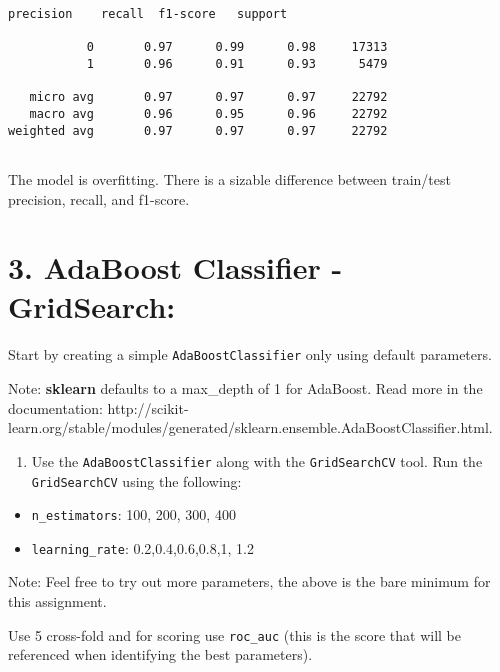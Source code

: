 \documentclass[11pt]{article}
\providecommand{\tightlist}{%
      \setlength{\itemsep}{0pt}\setlength{\parskip}{0pt}}
\begin{document}
    \begin{Verbatim}[commandchars=\\\{\}]
              precision    recall  f1-score   support

           0       0.97      0.99      0.98     17313
           1       0.96      0.91      0.93      5479

   micro avg       0.97      0.97      0.97     22792
   macro avg       0.96      0.95      0.96     22792
weighted avg       0.97      0.97      0.97     22792


    \end{Verbatim}

    The model is overfitting. There is a sizable difference between
train/test precision, recall, and f1-score.

    \hypertarget{adaboost-classifier---gridsearch}{%
\section{3. AdaBoost Classifier -
GridSearch:}\label{adaboost-classifier---gridsearch}}

Start by creating a simple \texttt{AdaBoostClassifier} only using
default parameters.

Note: \textbf{sklearn} defaults to a max\_depth of 1 for AdaBoost. Read
more in the documentation:
http://scikit-learn.org/stable/modules/generated/sklearn.ensemble.AdaBoostClassifier.html.

    \begin{enumerate}
\def\labelenumi{\alph{enumi})}
\tightlist
\item
  Use the \texttt{AdaBoostClassifier} along with the
  \texttt{GridSearchCV} tool. Run the \texttt{GridSearchCV} using the
  following:
\end{enumerate}

\begin{itemize}
\item
  \texttt{n\_estimators}: 100, 200, 300, 400
\item
  \texttt{learning\_rate}: 0.2,0.4,0.6,0.8,1, 1.2
\end{itemize}

Note: Feel free to try out more parameters, the above is the bare
minimum for this assignment.

Use 5 cross-fold and for scoring use \texttt{roc\_auc} (this is the
score that will be referenced when identifying the best parameters).
\end{document}

